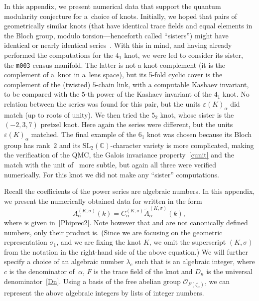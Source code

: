 \documentclass[pdftex]{sigma}
\numberwithin{equation}{section}
\def\BC{\mathbb C}
\def\calO{\mathcal O}
\def\wt{\widetilde}
\def\SL{\mathrm{SL}}
\def\z{\zeta}
\def\a{\alpha}
\def\a{\alpha}
\def\z{\zeta}
\def\s{\sigma}
\def\be{\begin{equation}}
\def\ee{\end{equation}}
\def\ve{\varepsilon}
\def\tiA{\wt A}
\begin{document}
In this appendix, we present numerical data that support the quantum modularity
conjecture for a~choice of knots. Initially, we hoped that pairs
of geometrically similar knots (that have identical trace fields and
equal elements in the Bloch group, modulo torsion---henceforth called
``sisters'') might have identical or nearly identical
series~\smash{$\Phi^{(K,\s_1)}_\a$}. With this in mind, and having already performed the
computations for the $4_1$ knot, we were led to consider its sister,
the \texttt{m003} census manifold. The latter is not a knot complement
(it is the complement of a~knot in a~lens space), but its 5-fold cyclic
cover is the complement of the (twisted) $5$-chain link, with a computable
Kashaev invariant, to be compared with the $5$-th power of the Kashaev
invariant of the $4_1$ knot. No relation between the series \smash{$\Phi^{(K,\s_1)}_\a$}
was found for this pair, but the units $\ve(K)_\a$ did match (up to roots
of unity). We then tried the $5_2$ knot, whose sister is the
$(-2,3,7)$ pretzel knot. Here again the series \smash{$\Phi^{(K,\s_1)}_\a$} were
different, but the units $\ve(K)_\a$ matched. The final
example of the $6_1$ knot was chosen because its Bloch group
has rank~$2$ and its $\SL_2(\BC)$-character variety is more complicated,
making the verification of the QMC, the Galois invariance
property~\eqref{cunit} and the match with the unit of~\cite{CGZ}
more subtle, but again all three were verified numerically. For this knot
we did not make any ``sister'' computations.

Recall the coefficients \smash{$A^{(K,\s)}_\a(k)$} of the power series
\smash{$\Phi^{(K,\s)}_\a(h)$} are algebraic numbers. In this appendix,
we present the numerically obtained data for \smash{$A^{(K,\s)}_\a(k)$}
written in the form
\be
\label{PhiA}
A^{(K,\s)}_\a(k) = C^{(K,\s)}_\a \tiA^{(K,\s)}_{\a}(k) ,
\ee
where \smash{$C^{(K,\s)}_\a=\mu_{\s,\a}\cdot(\ve_{\s,\a})^{\frac{1}{c}} \cdot
\delta_\s^{-\frac{1}{2}}$} is given in~\eqref{Phiprec2}.
Note however that \smash{$C^{(K,\s)}_\a$} and \smash{$\tiA^{(K,\s)}_{\a}(k)$} are not
canonically defined numbers, only their product is. (Since we are focusing
on the geometric representation $\s_1$, and we are fixing the knot $K$, we
omit the superscript $(K,\s)$ from the notation in the right-hand side of
the above equation.) We will further specify a choice of an algebraic number
$\lambda_c$ such that \smash{$\lambda_c^k  D_k  \tiA_{\a}(k) \in \calO_{F(\z_\a)}$}
is an algebraic integer, where $c$ is the denominator of~$\a$, $F$ is the
trace field of the knot and $D_n$ is
the universal denominator~\eqref{Dn}. Using a basis of the free abelian group
$\calO_{F(\z_\a)}$, we can represent the above algebraic integers by lists of
integer numbers.
\end{document}

